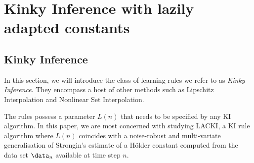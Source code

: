 \section{Kinky Inference with lazily adapted constants}


\label{sec:LACKI_all}

\subsection{Kinky Inference}
\label{sec:KI_core}
In this section, we will introduce the class of learning rules we refer to as \emph{Kinky Inference}. They encompass a host of other methods such as Lipschitz Interpolation and Nonlinear Set Interpolation.  
%

The rules possess a parameter $L(n)$ that needs to be specified by any KI algorithm. In this paper, we are most concerned with studying LACKI, a KI rule algorithm where $L(n)$ coincides with a noise-robust and multi-variate generalisation of Strongin's estimate \cite{Strongin1973} of a H\"older constant computed from the data set $\data_n$ available at time step $n$. 


